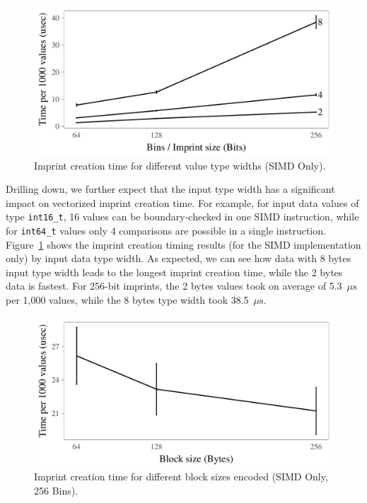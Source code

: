 \documentclass[sigconf]{acmart}
\begin{document}
\begin{figure}[t]
\begin{center}
\includegraphics[width=\columnwidth,trim=0mm 0mm 0mm 0mm,clip]{typewidth1.pdf}
\end{center}
\caption{Imprint creation time for different value type widths (SIMD Only).\label{fig:typewidth1}}
\end{figure}

Drilling down, we further expect that the input type width has a significant impact on vectorized imprint creation time. For example,
for input data values of type \texttt{int16\_t}, 16 values can be boundary-checked in one SIMD instruction, while for \texttt{int64\_t} values only
4 comparisons are possible in a single instruction. Figure~\ref{fig:typewidth1} shows the imprint creation timing results (for the SIMD 
implementation only) by input data type width. As expected, we can see how data with 8 bytes input type width leads to the longest imprint
creation time, while the 2 bytes data is fastest. For 256-bit imprints, the 2 bytes values took on average of 5.3~\(\mu\text{s}\) per 1,000
values, while the 8 bytes type width took 38.5~\(\mu\text{s}\).

\begin{figure}[t]
\begin{center}
\includegraphics[width=\columnwidth,trim=0mm 0mm 0mm 0mm,clip]{block_size_bytes1.pdf}
\end{center}
\caption{Imprint creation time for different block sizes encoded (SIMD Only, 256 Bins).\label{fig:bytesperblock1}}
\end{figure}
\end{document}
